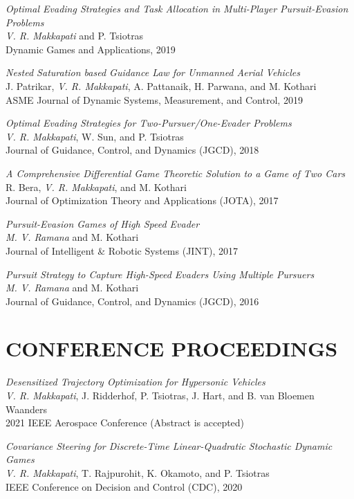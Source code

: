 \documentclass[margin, 10pt]{res} %
\begin{document}
\begin{resume}
{\sl Optimal Evading Strategies and Task Allocation in Multi-Player Pursuit-Evasion Problems} \\
\textit{V. R. Makkapati} and P. Tsiotras \\
Dynamic Games and Applications, 2019

{\sl Nested Saturation based Guidance Law for Unmanned Aerial Vehicles} \\
J. Patrikar, \textit{V. R. Makkapati}, A. Pattanaik, H. Parwana, and M. Kothari \\
ASME Journal of Dynamic Systems, Measurement, and Control, 2019

{\sl Optimal Evading Strategies for Two-Pursuer/One-Evader Problems} \\
\textit{V. R. Makkapati}, W. Sun, and P. Tsiotras \\
Journal of Guidance, Control, and Dynamics (JGCD), 2018

{\sl A Comprehensive Differential Game Theoretic Solution to a Game of Two Cars} \\ 
R. Bera, \textit{V. R. Makkapati}, and M. Kothari \\
Journal of Optimization Theory and Applications (JOTA), 2017 

{\sl Pursuit-Evasion Games of High Speed Evader} \\ 
\textit{M. V. Ramana} and M. Kothari \\
Journal of Intelligent \& Robotic Systems (JINT), 2017

{\sl Pursuit Strategy to Capture High-Speed Evaders Using Multiple Pursuers} \\
\textit{M. V. Ramana} and M. Kothari \\
Journal of Guidance, Control, and Dynamics (JGCD), 2016

\section{CONFERENCE PROCEEDINGS}

{\sl Desensitized Trajectory Optimization for Hypersonic Vehicles }\\
\textit{V. R. Makkapati}, J. Ridderhof, P. Tsiotras, J. Hart, and  B. van Bloemen Waanders\\
2021 IEEE Aerospace Conference (Abstract is accepted)

{\sl Covariance Steering for Discrete-Time Linear-Quadratic Stochastic Dynamic Games}\\
\textit{V. R. Makkapati}, T. Rajpurohit, K. Okamoto, and P. Tsiotras \\
IEEE Conference on Decision and Control (CDC), 2020 


\end{resume}
\end{document}
